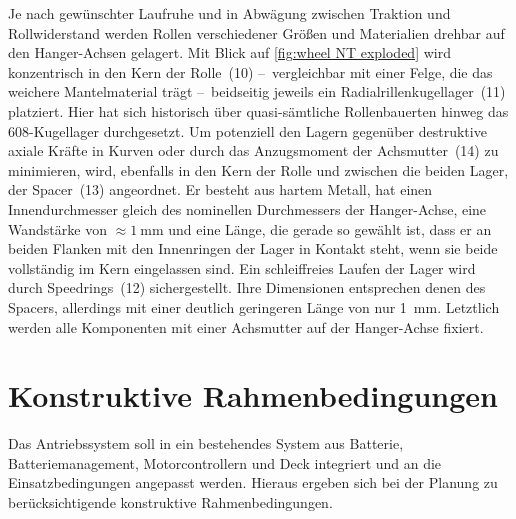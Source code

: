 		Je nach gewünschter Laufruhe und in Abwägung zwischen Traktion und Rollwiderstand werden Rollen verschiedener Größen und Materialien drehbar auf den Hanger-Achsen gelagert.
		Mit Blick auf \cref{fig:wheel NT exploded} wird konzentrisch in den Kern der Rolle~(10) --~vergleichbar mit einer Felge, die das weichere Mantelmaterial trägt --~beidseitig jeweils ein Radialrillenkugellager~(11) platziert.
		Hier hat sich historisch über quasi-sämtliche Rollenbauerten hinweg das 608-Kugellager durchgesetzt.
		Um potenziell den Lagern gegenüber destruktive axiale Kräfte in Kurven oder durch das Anzugsmoment der Achsmutter~(14) zu minimieren, wird, ebenfalls in den Kern der Rolle und zwischen die beiden Lager, der Spacer~(13) angeordnet.
		Er besteht aus hartem Metall, hat einen Innendurchmesser gleich des nominellen Durchmessers der Hanger-Achse, eine Wandstärke von \(\approx \qty{1}{\milli\metre}\) und eine Länge, die gerade so gewählt ist, dass er an beiden Flanken mit den Innenringen der Lager in Kontakt steht, wenn sie beide vollständig im Kern eingelassen sind.
		Ein schleiffreies Laufen der Lager wird durch Speedrings~(12) sichergestellt.
		Ihre Dimensionen entsprechen denen des Spacers, allerdings mit einer deutlich geringeren Länge von nur \qty{1}{\milli\metre}.
		Letztlich werden alle Komponenten mit einer Achsmutter auf der Hanger-Achse fixiert.
	\section{Konstruktive Rahmenbedingungen}\label{sec:constructive limitations}
		Das Antriebssystem soll in ein bestehendes System aus Batterie, Batteriemanagement, Motorcontrollern und Deck integriert und an die Einsatzbedingungen angepasst werden.
		Hieraus ergeben sich bei der Planung zu berücksichtigende konstruktive Rahmenbedingungen.
